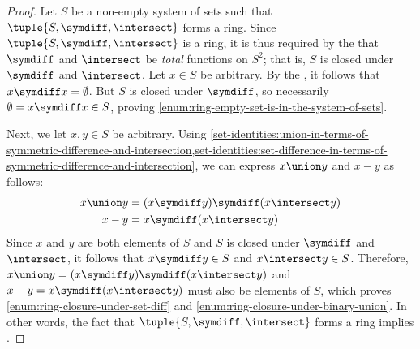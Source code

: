 \begin{proof}
    Let \( S \) be a non-empty system of sets such that \( \tuple{S, \symdiff, \intersect} \) forms a ring.
    Since \( \tuple{S, \symdiff, \intersect} \) is a ring, it is thus required by the  that
    \( \symdiff \) and \( \intersect \) be \emph{total} functions on \( S^{2} \); that is, \( S \) is closed under \( \symdiff \) and \( \intersect \).
    Let \( x \in S \) be arbitrary.
    By the ,
    it follows that \( x \symdiff x = \emptyset \). But \( S \) is closed under \( \symdiff \), so necessarily \( \emptyset = x \symdiff x \in S \), proving
    \ref{enum:ring-empty-set-is-in-the-system-of-sets}.

    \vspace{0.3cm}
    \noindent
    Next, we let \( x, y \in S \) be arbitrary.
    Using \cref{set-identities:union-in-terms-of-symmetric-difference-and-intersection,set-identities:set-difference-in-terms-of-symmetric-difference-and-intersection},
    we can express \( x \union y \) and \( x - y \) as follows:
    \begin{align*}
        x \union y &= \mleft( x \symdiff y \mright) \symdiff \mleft( x \intersect y \mright)\\
        x - y &= x \symdiff \mleft( x \intersect y \mright)
    \end{align*}
    Since \( x \) and \( y \) are both elements of \( S \) and \( S \) is closed under \( \symdiff \) and \( \intersect \), it follows that \( x \symdiff y \in S \)
    and \( x \intersect y \in S \).
    Therefore, \( x \union y = \mleft( x \symdiff y \mright) \symdiff \mleft( x \intersect y \mright) \) and \( x - y = x \symdiff \mleft( x \intersect y \mright) \)
    must also be elements of \( S \), which proves \ref{enum:ring-closure-under-set-diff} and \ref{enum:ring-closure-under-binary-union}. In other words, the fact
    that \( \tuple{S, \symdiff, \intersect} \) forms a ring implies .


\end{proof}
